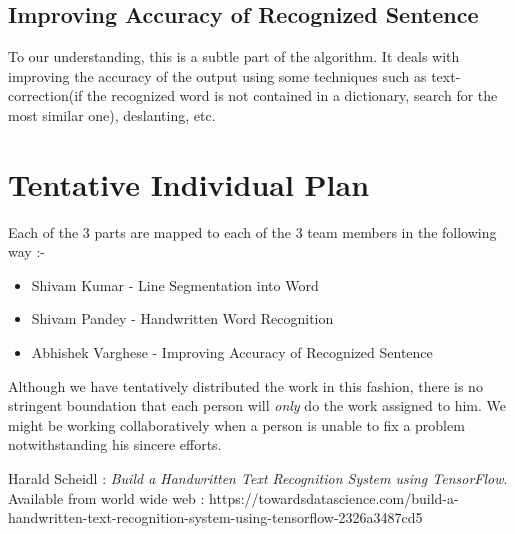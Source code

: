 \documentclass[a4paper, 12pt]{article}
\begin{document}
\subsection{Improving Accuracy of Recognized Sentence}
To our understanding, this is a subtle part of the algorithm. It deals with improving the accuracy of the output using some techniques such as text-correction(if the recognized word is not contained in a dictionary, search for the most similar one), deslanting, etc.

\section{Tentative Individual Plan}
Each of the 3 parts are mapped to each of the 3 team members in the following way :-
\begin{itemize}
    \item Shivam Kumar - Line Segmentation into Word
    \item Shivam Pandey - Handwritten Word Recognition
    \item Abhishek Varghese - Improving Accuracy of Recognized Sentence
\end{itemize}
Although we have tentatively distributed the work in this fashion, there is no stringent boundation that each person will \emph{only} do the work assigned to him. We might be working collaboratively when a person is unable to fix a problem notwithstanding his sincere efforts.
\begin{thebibliography}{9}
	

 Harald Scheidl : \emph{Build a Handwritten Text Recognition System using TensorFlow}. Available  from world wide web : https://towardsdatascience.com/build-a-handwritten-text-recognition-system-using-tensorflow-2326a3487cd5

\end{thebibliography}
\end{document}

